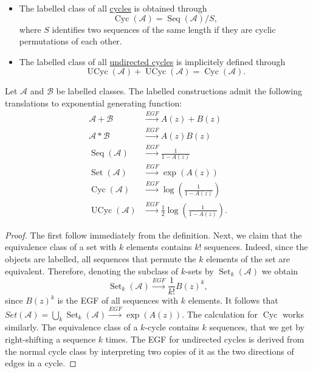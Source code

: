 \begin{defn}
\begin{itemize}
    \item The labelled class of all \ul{cycles} is obtained through
    \begin{equation*}
        \operatorname{Cyc}(\mathcal{A}) = \operatorname{Seq}(\mathcal{A}) / S, 
    \end{equation*}
    where $S$ identifies two sequences of the same length if they are cyclic permutations of each other.
    
    \item The labelled class of all \ul{undirected cycles} is implicitely defined through
    \begin{equation*}
        \operatorname{UCyc}(\mathcal{A}) + \operatorname{UCyc}(\mathcal{A}) = \operatorname{Cyc}(\mathcal{A}).
    \end{equation*}
    
\end{itemize}
\end{defn}

\begin{thm}
Let $\mathcal{A}$ and $\mathcal{B}$ be labelled classes. The labelled constructions admit the following translations to exponential generating function:
\begin{align*}
    \mathcal{A} + \mathcal{B} &\xrightarrow{EGF} A(z) + B(z) \\
    \mathcal{A} \ast \mathcal{B} &\xrightarrow{EGF} A(z) B(z) \\
    \operatorname{Seq}(\mathcal{A}) &\xrightarrow{EGF} \frac{1}{1-A(z)} \\
    \operatorname{Set}(\mathcal{A}) &\xrightarrow{EGF} \exp(A(z)) \\
    \operatorname{Cyc}(\mathcal{A}) &\xrightarrow{EGF} \log\left(\frac{1}{1 - A(z)}\right)\\
    \operatorname{UCyc}(\mathcal{A}) &\xrightarrow{EGF} \frac{1}{2} \log\left(\frac{1}{1 - A(z)}\right).
\end{align*}
\end{thm}
\begin{proof}
    The first follow immediately from the definition.
    Next, we claim that the equivalence class of a set with $k$ elements contains $k!$ sequences.
    Indeed, since the objects are labelled, all sequences that permute the $k$ elements of the set are equivalent.
    Therefore, denoting the subclass of $k$-sets by $\operatorname{Set}_k(\mathcal{A})$ we obtain
    \[
        \operatorname{Set}_k(\mathcal{A}) \xrightarrow{EGF} \frac{1}{k!} B(z)^k, 
    \]
    since $B(z)^k$ is the EGF of all sequences with $k$ elements.
    It follows that $Set(\mathcal{A}) = \bigcup_k \operatorname{Set}_k(\mathcal{A}) \xrightarrow{EGF} \exp(A(z))$.
    The calculation for $\operatorname{Cyc}$ works similarly. The equivalence class of a $k$-cycle contains $k$ sequences, that we get by right-shifting a sequence $k$ times.
    The EGF for undirected cycles is derived from the normal cycle class by interpreting two copies of it as the two directions of edges in a cycle.
\end{proof}


